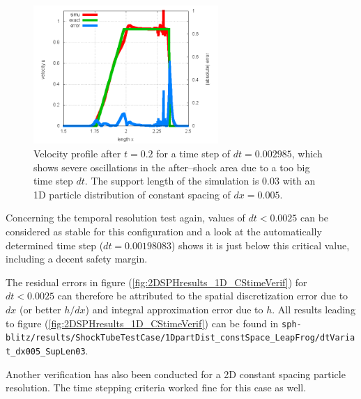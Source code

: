 \documentclass{report}
\begin{document}
\begin{figure}[!htbp]

\centering
\label{fig:2DSPHresults_dt_variat_oscillationU}
\includegraphics[width=7cm]{Graphics/results/ShockTube/1D_CS_LF_SD/dtVariat_dx005_SupLen03_dt03_Oscillations/Err_u00200000}
\caption[Velocity oscillations due to temporal instability]{Velocity profile after $t=0.2$ for a time step of $dt=0.002985$, which shows severe oscillations in the after--shock area due to a too big time step $dt$. The support length of the simulation is $0.03$ with an 1D particle distribution of constant spacing of $dx=0.005$.}

\end{figure}

Concerning the temporal resolution test again, values of $dt<0.0025$ can be considered as stable for this configuration and a look at the automatically determined time step ($dt=0.00198083$) shows it is just below this critical value, including a decent safety margin.

The residual errors in figure (\ref{fig:2DSPHresults_1D_CStimeVerif}) for $dt<0.0025$ can therefore be attributed to the spatial discretization error due to $dx$ (or better $h/dx$) and integral approximation error due to $h$. All results leading to figure (\ref{fig:2DSPHresults_1D_CStimeVerif}) can be found in {\tt sph-blitz/results/ShockTubeTestCase/1DpartDist\_constSpace\_LeapFrog/dtVariat\_dx005\_SupLen03}.

Another verification has also been conducted for a 2D constant spacing particle resolution. The time stepping criteria worked fine for this case as well. 
\end{document}

